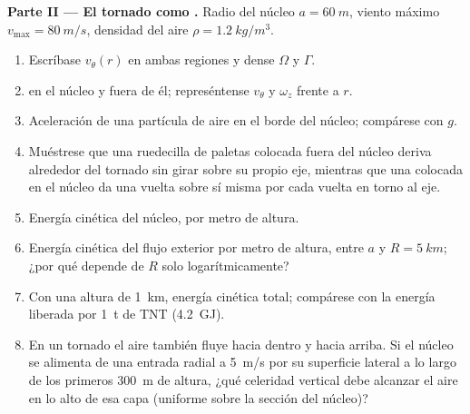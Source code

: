 \begin{problem}
\medskip
\noindent\textbf{Parte II --- El tornado como .}
Radio del núcleo $a = \qty{60}{m}$, viento máximo $v_{\max} = \qty{80}{m/s}$,
densidad del aire $\rho = \qty{1.2}{kg/m^3}$.
\begin{enumerate}[resume]
  \item Escríbase $v_\theta(r)$ en ambas regiones y dense $\Omega$ y $\Gamma$.
  \item {} en el núcleo y fuera de él; represéntense $v_\theta$ y $\omega_z$
        frente a $r$.
  \item Aceleración de una partícula de aire en el borde del núcleo;
        compárese con $g$.
  \item Muéstrese que una ruedecilla de paletas colocada fuera del núcleo
        deriva alrededor del tornado sin girar sobre su propio eje,
        mientras que una colocada en el núcleo da una vuelta sobre sí
        misma por cada vuelta en torno al eje.
  \item Energía cinética del núcleo, por metro de altura.
  \item Energía cinética del flujo exterior por metro de altura, entre
        $a$ y $R = \qty{5}{km}$; ¿por qué depende de $R$ solo
        logarítmicamente?
  \item Con una altura de \qty{1}{km}, energía cinética total; compárese
        con la energía liberada por \qty{1}{t} de TNT (\qty{4.2}{GJ}).
  \item En un tornado el aire también fluye hacia dentro y hacia arriba.
        Si el núcleo se alimenta de una entrada radial a \qty{5}{m/s} por
        su superficie lateral a lo largo de los primeros \qty{300}{m} de
        altura, ¿qué celeridad vertical debe alcanzar el aire en lo alto
        de esa capa (uniforme sobre la sección del núcleo)?
\end{enumerate}


\end{problem}
